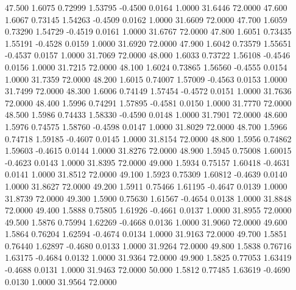   47.500   1.6075   0.72999   1.53795  -0.4500   0.0164   1.0000  31.6446  72.0000
  47.600   1.6067   0.73145   1.54263  -0.4509   0.0162   1.0000  31.6609  72.0000
  47.700   1.6059   0.73290   1.54729  -0.4519   0.0161   1.0000  31.6767  72.0000
  47.800   1.6051   0.73435   1.55191  -0.4528   0.0159   1.0000  31.6920  72.0000
  47.900   1.6042   0.73579   1.55651  -0.4537   0.0157   1.0000  31.7069  72.0000
  48.000   1.6033   0.73722   1.56108  -0.4546   0.0156   1.0000  31.7215  72.0000
  48.100   1.6024   0.73865   1.56560  -0.4555   0.0154   1.0000  31.7359  72.0000
  48.200   1.6015   0.74007   1.57009  -0.4563   0.0153   1.0000  31.7499  72.0000
  48.300   1.6006   0.74149   1.57454  -0.4572   0.0151   1.0000  31.7636  72.0000
  48.400   1.5996   0.74291   1.57895  -0.4581   0.0150   1.0000  31.7770  72.0000
  48.500   1.5986   0.74433   1.58330  -0.4590   0.0148   1.0000  31.7901  72.0000
  48.600   1.5976   0.74575   1.58760  -0.4598   0.0147   1.0000  31.8029  72.0000
  48.700   1.5966   0.74718   1.59185  -0.4607   0.0145   1.0000  31.8154  72.0000
  48.800   1.5956   0.74862   1.59603  -0.4615   0.0144   1.0000  31.8276  72.0000
  48.900   1.5945   0.75008   1.60015  -0.4623   0.0143   1.0000  31.8395  72.0000
  49.000   1.5934   0.75157   1.60418  -0.4631   0.0141   1.0000  31.8512  72.0000
  49.100   1.5923   0.75309   1.60812  -0.4639   0.0140   1.0000  31.8627  72.0000
  49.200   1.5911   0.75466   1.61195  -0.4647   0.0139   1.0000  31.8739  72.0000
  49.300   1.5900   0.75630   1.61567  -0.4654   0.0138   1.0000  31.8848  72.0000
  49.400   1.5888   0.75805   1.61926  -0.4661   0.0137   1.0000  31.8955  72.0000
  49.500   1.5876   0.75994   1.62269  -0.4668   0.0136   1.0000  31.9060  72.0000
  49.600   1.5864   0.76204   1.62594  -0.4674   0.0134   1.0000  31.9163  72.0000
  49.700   1.5851   0.76440   1.62897  -0.4680   0.0133   1.0000  31.9264  72.0000
  49.800   1.5838   0.76716   1.63175  -0.4684   0.0132   1.0000  31.9364  72.0000
  49.900   1.5825   0.77053   1.63419  -0.4688   0.0131   1.0000  31.9463  72.0000
  50.000   1.5812   0.77485   1.63619  -0.4690   0.0130   1.0000  31.9564  72.0000
